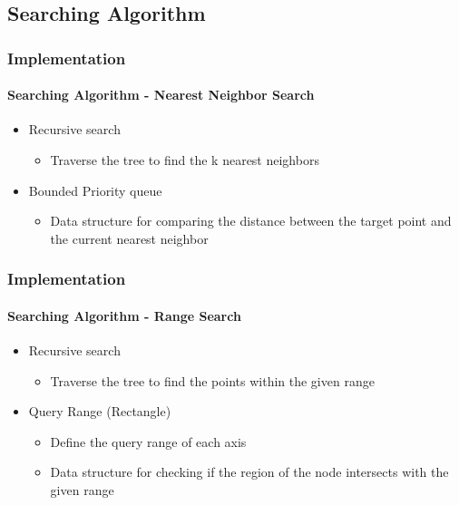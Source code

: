 \documentclass[
	12pt, %
	aspectratio=169, %
]{beamer}
\begin{document}
\subsection{Searching Algorithm}

\begin{frame}
	\frametitle{Implementation}
	\framesubtitle{Searching Algorithm - Nearest Neighbor Search}

	\begin{itemize}
		\item Recursive search
		\begin{itemize}
			\item Traverse the tree to find the k nearest neighbors
		\end{itemize}
		\item Bounded Priority queue
		\begin{itemize}
			\item Data structure for comparing the distance between the target point and the current nearest neighbor
		\end{itemize}
	\end{itemize}
\end{frame}


\begin{frame}
	\frametitle{Implementation}
	\framesubtitle{Searching Algorithm - Range Search}

	\begin{itemize}
		\item Recursive search
		\begin{itemize}
			\item Traverse the tree to find the points within the given range
		\end{itemize}
		\item Query Range (Rectangle)
		\begin{itemize}
			\item Define the query range of each axis
			\item Data structure for checking if the region of the node intersects with the given range
		\end{itemize}
	\end{itemize}
\end{frame}
\end{document}
